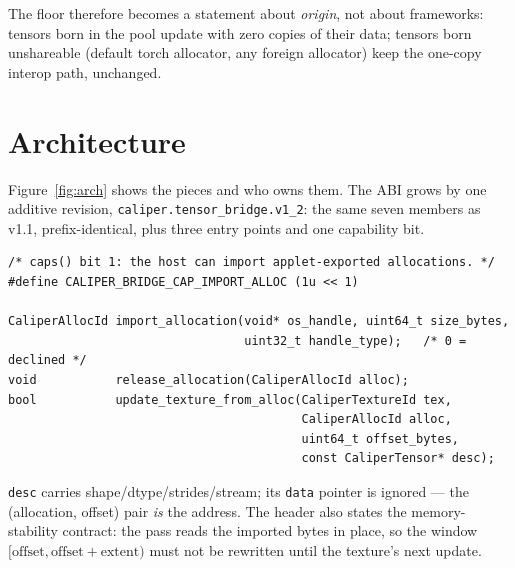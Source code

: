 \documentclass[11pt]{article}
\begin{document}
The floor therefore becomes a statement about \emph{origin}, not about
frameworks: tensors born in the pool update with zero copies of their data;
tensors born unshareable (default torch allocator, any foreign allocator)
keep the one-copy interop path, unchanged.

\section{Architecture}

Figure~\ref{fig:arch} shows the pieces and who owns them. The ABI grows by
one additive revision, \texttt{caliper.tensor\_bridge.v1\_2}: the same seven
members as v1.1, prefix-identical, plus three entry points and one
capability bit.

\begin{lstlisting}
/* caps() bit 1: the host can import applet-exported allocations. */
#define CALIPER_BRIDGE_CAP_IMPORT_ALLOC (1u << 1)

CaliperAllocId import_allocation(void* os_handle, uint64_t size_bytes,
                                 uint32_t handle_type);   /* 0 = declined */
void           release_allocation(CaliperAllocId alloc);
bool           update_texture_from_alloc(CaliperTextureId tex,
                                         CaliperAllocId alloc,
                                         uint64_t offset_bytes,
                                         const CaliperTensor* desc);
\end{lstlisting}

\noindent
\texttt{desc} carries shape/dtype/strides/stream; its \texttt{data} pointer
is ignored --- the (allocation, offset) pair \emph{is} the address. The header
also states the memory-stability contract: the pass reads the imported bytes
in place, so the window $[\text{offset}, \text{offset}+\text{extent})$ must
not be rewritten until the texture's next update.
\end{document}
